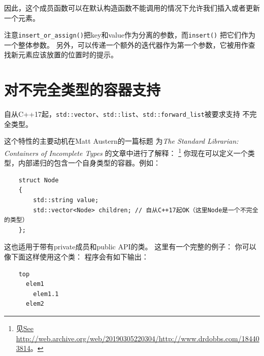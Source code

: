 因此，这个成员函数可以在默认构造函数不能调用的情况下允许我们插入或者更新一个元素。

注意\texttt{insert\_or\_assign()}把key和value作为分离的参数，而\texttt{insert()}
把它们作为一个整体参数。
另外，可以传递一个额外的迭代器作为第一个参数，它被用作查找新元素应该放置的位置时的提示。


\section{对不完全类型的容器支持}
自从C++17起，\texttt{std::vector}、\texttt{std::list}、\texttt{std::forward\_list}被要求支持
不完全类型。

这个特性的主要动机在Matt Austern的一篇标题
为\emph{The Standard Librarian: Containers of Incomplete Types}
的文章中进行了解释：
\footnote{见\url{See http://web.archive.org/web/20190305220304/http://www.drdobbs.com/184403814}。}
你现在可以定义一个类型，内部递归的包含一个自身类型的容器。例如：
\begin{lstlisting}
    struct Node
    {
        std::string value;
        std::vector<Node> children; // 自从C++17起OK（这里Node是一个不完全的类型）
    };
\end{lstlisting}
这也适用于带有private成员和public API的类。
这里有一个完整的例子：
你可以像下面这样使用这个类：
程序会有如下输出：
\begin{lstlisting}
    top
      elem1
        elem1.1
      elem2
\end{lstlisting}


